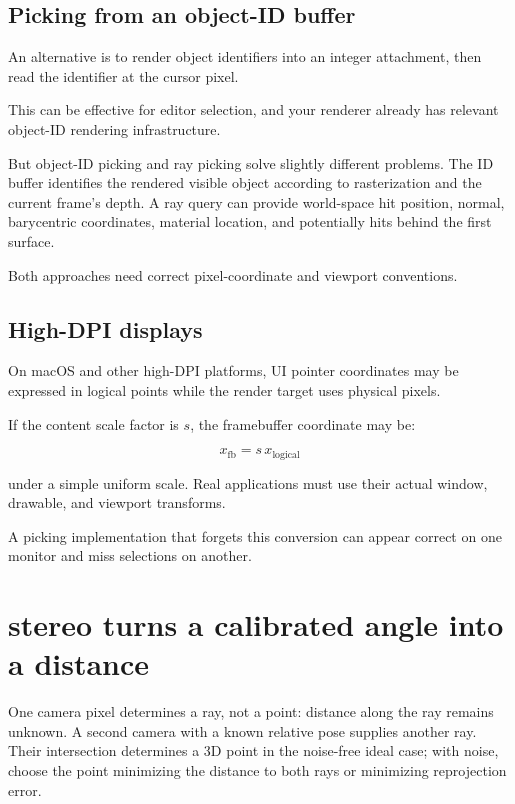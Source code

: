 \subsection{Picking from an object-ID buffer}\label{02-foundations-ii-ch035-picking-from-an-object-id-buffer}

An alternative is to render object identifiers into an integer attachment, then read the identifier at the cursor pixel.

This can be effective for editor selection, and your renderer already has relevant object-ID rendering infrastructure.

But object-ID picking and ray picking solve slightly different problems. The ID buffer identifies the rendered visible object according to rasterization and the current frame's depth. A ray query can provide world-space hit position, normal, barycentric coordinates, material location, and potentially hits behind the first surface.

Both approaches need correct pixel-coordinate and viewport conventions.

\subsection{High-DPI displays}\label{02-foundations-ii-ch035-high-dpi-displays}

On macOS and other high-DPI platforms, UI pointer coordinates may be expressed in logical points while the render target uses physical pixels.

If the content scale factor is \(s\), the framebuffer coordinate may be:

\[ x_{\mathrm{fb}}=s\,x_{\mathrm{logical}} \]

under a simple uniform scale. Real applications must use their actual window, drawable, and viewport transforms.

A picking implementation that forgets this conversion can appear correct on one monitor and miss selections on another.

\section{stereo turns a calibrated angle into a distance}\label{02-foundations-ii-ch035-stereo-turns-a-calibrated-angle-into-a-distance}

One camera pixel determines a ray, not a point: distance along the ray remains unknown. A second camera with a known relative pose supplies another ray. Their intersection determines a 3D point in the noise-free ideal case; with noise, choose the point minimizing the distance to both rays or minimizing reprojection error.

